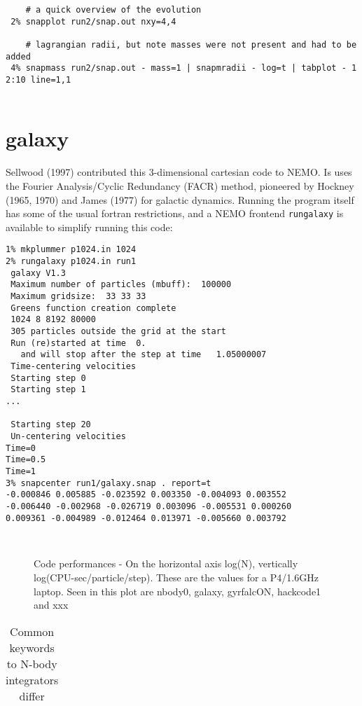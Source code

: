 \begin{itemize}
\begin{itemize}
\begin{verbatim}
    # a quick overview of the evolution 
 2% snapplot run2/snap.out nxy=4,4

    # lagrangian radii, but note masses were not present and had to be added
 4% snapmass run2/snap.out - mass=1 | snapmradii - log=t | tabplot - 1 2:10 line=1,1


\end{verbatim}\normalsize




\section{galaxy}

Sellwood (1997) contributed this 3-dimensional cartesian code to NEMO. Is uses the
Fourier Analysis/Cyclic Redundancy (FACR) method, pioneered by
Hockney (1965, 1970) and James (1977) for galactic dynamics. Running
the program itself has some of the usual fortran 
restrictions, and a NEMO frontend {\tt rungalaxy}
is available to simplify running this code:

\footnotesize\begin{verbatim}
1% mkplummer p1024.in 1024
2% rungalaxy p1024.in run1
 galaxy V1.3 
 Maximum number of particles (mbuff):  100000
 Maximum gridsize:  33 33 33
 Greens function creation complete
 1024 8 8192 80000
 305 particles outside the grid at the start
 Run (re)started at time  0.
   and will stop after the step at time   1.05000007
 Time-centering velocities
 Starting step 0
 Starting step 1
...

 Starting step 20
 Un-centering velocities
Time=0
Time=0.5
Time=1
3% snapcenter run1/galaxy.snap . report=t
-0.000846 0.005885 -0.023592 0.003350 -0.004093 0.003552 
-0.006440 -0.002968 -0.026719 0.003096 -0.005531 0.000260 
0.009361 -0.004989 -0.012464 0.013971 -0.005660 0.003792 



\end{verbatim}\normalsize

\begin{figure}[htb]
\caption[Code Performances]
{Code performances - On the horizontal axis log(N), vertically log(CPU-sec/particle/step).
These are the values for a P4/1.6GHz laptop. Seen in this plot
are nbody0, galaxy, gyrfalcON, hackcode1 and xxx}
\label{f:performance}
\end{figure}


\begin{center}
\begin{table}[h]
\caption[Common integrator keywords]
{Common keywords to N-body integrators differ}
\begin{tabular}{||l|l|l|l|l|l||}


\end{tabular}
\end{table}
\end{center}
\end{itemize}
\end{itemize}
